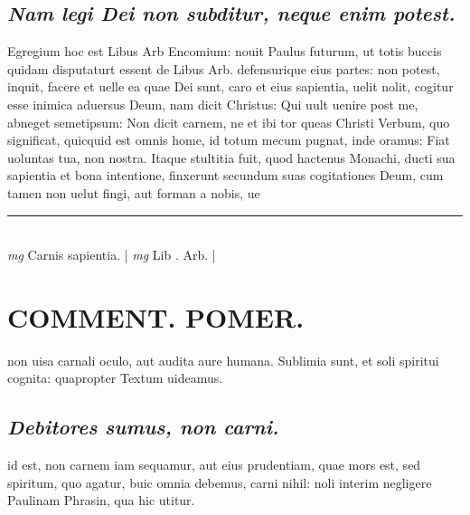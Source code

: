 \documentclass{article}
\begin{document}
\begin{pages}
\subsection*{\textit{Nam legi Dei non subditur, neque  enim potest. }}\pstart Egregium hoc est Libus Arb Encomium: nouit Paulus futurum, ut totis buccis quidam disputaturt essent de Libus Arb. defensurique eius partes: non potest, inquit, facere et uelle ea quae Dei sunt, caro et eius sapientia, uelit nolit, cogitur esse inimica aduersus Deum, nam dicit Christus: Qui uult uenire post me, abneget semetipsum: Non dicit carnem, ne et ibi tor queas Christi Verbum, quo significat, quicquid est omnis home, id totum mecum pugnat, inde oramus: Fiat uoluntas tua, non nostra. Itaque stultitia fuit, quod hactenus Monachi, ducti sua sapientia et bona intentione, finxerunt secundum suas cogitationes Deum, cum tamen non uelut fingi, aut forman a nobis, ue\pend
\vspace{0.5cm}\noindent
\vspace{0.2cm}\rule{1cm}{0.2pt}\\ 
\hspace{0.2cm}\textit{mg}
\footnotesize Carnis sapientia.  
\normalsize| 
\hspace{0.2cm}\textit{mg}
\footnotesize Lib . Arb.  
\normalsize| 
\section*{COMMENT. POMER.  }\pstart non uisa carnali oculo, aut audita aure humana. Sublimia sunt, et soli spiritui cognita: quapropter Textum uideamus.   \pend
{}
{}
\subsection*{\textit{Debitores sumus, non carni. }}\pstart id est, non carnem iam sequamur, aut eius prudentiam, quae mors est, sed spiritum, quo agatur, buic omnia debemus, carni nihil: noli interim negligere Paulinam Phrasin, qua hic utitur.   \pend
{}
{}

\end{pages}
\end{document}
